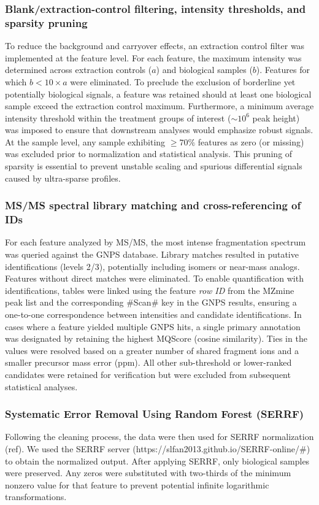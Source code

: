 \documentclass[10pt,letterpaper]{article}
\begin{document}
\subsubsection*{Blank/extraction-control filtering, intensity thresholds, and sparsity pruning}
To reduce the background and carryover effects, an extraction control filter was implemented at the feature level. For each feature, the maximum intensity was determined across extraction controls (\(a\)) and biological samples (\(b\)). Features for which \(b < 10\times a\) were eliminated. To preclude the exclusion of borderline yet potentially biological signals, a feature was retained should at least one biological sample exceed the extraction control maximum. Furthermore, a minimum average intensity threshold within the treatment groups of interest (\(\sim 10^{6}\) peak height) was imposed to ensure that downstream analyses would emphasize robust signals. At the sample level, any sample exhibiting \(\geq 70\%\) features as zero (or missing) was excluded prior to normalization and statistical analysis. This pruning of sparsity is essential to prevent unstable scaling and spurious differential signals caused by ultra-sparse profiles. 


\subsubsection*{MS/MS spectral library matching and cross-referencing of IDs}
For each feature analyzed by MS/MS, the most intense fragmentation spectrum was queried against the GNPS database. Library matches resulted in putative identifications (levels 2/3), potentially including isomers or near-mass analogs. Features without direct matches were eliminated. To enable quantification with identifications, tables were linked using the feature \emph{row ID} from the MZmine peak list and the corresponding \#Scan\# key in the GNPS results, ensuring a one-to-one correspondence between intensities and candidate identifications. In cases where a feature yielded multiple GNPS hits, a single primary annotation was designated by retaining the highest MQScore (cosine similarity). Ties in the values were resolved based on a greater number of shared fragment ions and a smaller precursor mass error (ppm). All other sub-threshold or lower-ranked candidates were retained for verification but were excluded from subsequent statistical analyses.

\subsubsection*{Systematic Error Removal Using Random Forest (SERRF)}
Following the cleaning process, the data were then used for SERRF normalization (ref). We used the SERRF server (https://slfan2013.github.io/SERRF-online/\#) to obtain the normalized output. After applying SERRF, only biological samples were preserved. Any zeros were substituted with two-thirds of the minimum nonzero value for that feature to prevent potential infinite logarithmic transformations.
\end{document}
